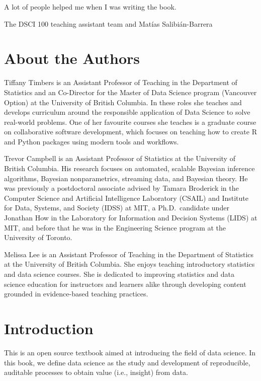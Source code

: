 \documentclass[
]{krantz}
\begin{document}
A lot of people helped me when I was writing the book.

\begin{flushright}
The DSCI 100 teaching assistant team and Matías Salibián-Barrera
\end{flushright}

\hypertarget{about-the-authors}{%
\chapter*{About the Authors}\label{about-the-authors}}


Tiffany Timbers is an Assistant Professor of Teaching in the Department of Statistics and an Co-Director for the Master of Data Science program (Vancouver Option) at the University of British Columbia. In these roles she teaches and develops curriculum around the responsible application of Data Science to solve real-world problems. One of her favourite courses she teaches is a graduate course on collaborative software development, which focuses on teaching how to create R and Python packages using modern tools and workflows.

Trevor Campbell is an Assistant Professor of Statistics at the University of British Columbia. His research focuses on automated, scalable Bayesian inference algorithms, Bayesian nonparametrics, streaming data, and Bayesian theory. He was previously a postdoctoral associate advised by Tamara Broderick in the Computer Science and Artificial Intelligence Laboratory (CSAIL) and Institute for Data, Systems, and Society (IDSS) at MIT, a Ph.D.~candidate under Jonathan How in the Laboratory for Information and Decision Systems (LIDS) at MIT, and before that he was in the Engineering Science program at the University of Toronto.

Melissa Lee is an Assistant Professor of Teaching in the Department of Statistics at the University of British Columbia. She enjoys teaching introductory statistics and data science courses. She is dedicated to improving statistics and data science education for instructors and learners alike through developing content grounded in evidence-based teaching practices.

\mainmatter

\hypertarget{introduction}{%
\chapter{Introduction}\label{introduction}}

This is an open source textbook aimed at introducing the field of data science. In this book, we define data science as the study and development of reproducible, auditable processes to obtain value (i.e., insight) from data.
\end{document}
